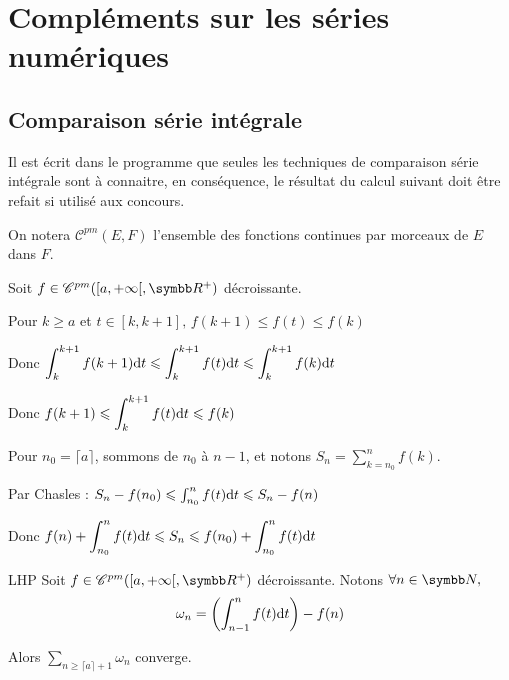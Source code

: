 \section{Compléments sur les séries numériques}
\subsection{Comparaison série intégrale}

Il est écrit dans le programme que seules les techniques de comparaison série intégrale sont à connaitre, en conséquence, le résultat du calcul suivant doit être refait si utilisé aux concours. 

On notera $\mathscr C^{pm}(E, F)$ l'ensemble des fonctions continues par morceaux de $E$ dans $F$.

Soit $f \in \mathscr C^{pm}( [a, + \infty[ , \R^+)$ décroissante. 

Pour $k \geqslant a$ et $ t \in [k, k+ 1 ], \, f(k + 1) \leqslant f(t) \leqslant f(k)$

Donc $\displaystyle \int_{k}^{k + 1} f(k + 1) \text d t \leqslant \int_{k}^{k + 1} f(t) \text d t \leqslant \int_{k}^{k + 1} f(k) \text d t$

Donc $\displaystyle f(k + 1) \leqslant \int_{k}^{k + 1} f(t) \text d t \leqslant f(k)$

Pour $n_0 = \lceil a \rceil$, sommons de $n_0$ à $n - 1$, et notons $\displaystyle S_n = \sum_{k = n_0}^{n} f(k)$.

Par Chasles : $S_n - f(n_0) \leqslant \int_{n_0}^{n} f(t) \text d t \leqslant S_n - f(n)$

Donc $\displaystyle f(n) + \int_{n_0}^{n} f(t) \text d t \leqslant S_n \leqslant f(n_0) + \int_{n_0}^{n} f(t) \text d t$

\begin{theoreme}{LHP}{}
    Soit $f \in \mathscr C^{pm}([a, + \infty[, \R^+)$ décroissante. 
    Notons $\forall n \in \N,$ 
    \[\omega_n = \left( \int_{n - 1 }^{n } f(t) \text d t \right) - f(n)\]

    Alors $\displaystyle \sum_{n \geqslant \lceil a \rceil + 1} \omega_n$ converge.
\end{theoreme}



